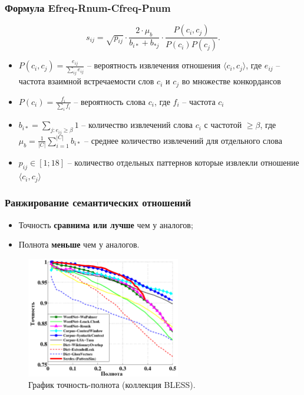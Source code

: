 \documentclass{beamer}
\begin{document}
\begin{frame}
\frametitle{Формула Efreq-Rnum-Cfreq-Pnum}

  
$$s_{ij} = \sqrt{p_{ij}} \cdot \frac{2\cdot\mu_b }{b_{i*}+b_{*j}} \cdot \frac{P(c_i,c_j)}{P(c_i)P(c_j)}.$$


\begin{itemize}


\item $P(c_i,c_j)=\frac{e_{ij}}{\sum_{ij}e_{ij}}$ -- вероятность извлечения
отношения $\langle c_i,c_j \rangle$, где $e_{ij}$ -- частота
взаимной встречаемости слов $c_i$ и $c_j$ во множестве конкордансов

\item $P(c_i)= \frac{f_i}{\sum_i f_i}$ -- вероятность слова $c_i$, где $f_i$
-- частота $c_i$
\item $b_{i*} = \sum_{j:e_{ij} \geq \beta} 1$ -- количество извлечений слова
$c_i$ с частотой $\geq \beta$,  где $\mu_b = \frac{1}{|C|}\sum_{i=1}^{|C|}
b_{i*}$ -- среднее количество извлечений для отдельного слова

\item $p_{ij} \in [1;18]$ -- количество отдельных паттернов которые извлекли
отношение $\langle c_i, c_j \rangle$
  
 
\end{itemize}

\end{frame}






\begin{frame}
\frametitle{Ранжирование семантических отношений}

\begin{itemize}
  \item Точность \textbf{сравнима или лучше} чем у аналогов;
  \item Полнота \textbf{меньше} чем у аналогов.
\end{itemize}

\begin{figure}	
	\centering
	\includegraphics[width=0.6\textwidth]{pr}
	\caption{График точность-полнота (коллекция BLESS).
	}
\end{figure}

\end{frame}
\end{document}
